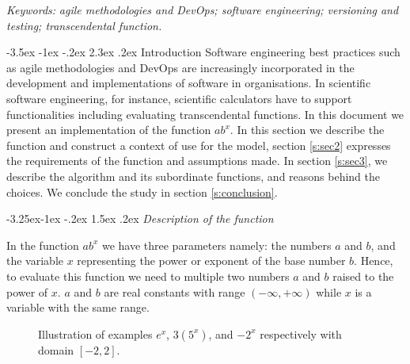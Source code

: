 \documentclass[11pt]{article}
\makeatletter
\renewcommand\section{\@startsection {section}{1}{\z@}%
                                       {-3.5ex \@plus -1ex \@minus -.2ex}%
                                       {2.3ex \@plus.2ex}%
                                       {\normalfont\fontfamily{phv}\fontsize{16}{19}\bfseries}}
\renewcommand\subsection{\@startsection{subsection}{2}{\z@}%
                                         {-3.25ex\@plus -1ex \@minus -.2ex}%
                                         {1.5ex \@plus .2ex}%
                                         {\normalfont\fontfamily{phv}\fontsize{14}{17}\bfseries}}
\makeatother
\begin{document}
	\noindent%
	{\it Keywords:} \emph{agile methodologies and DevOps; software engineering; versioning and testing; transcendental function.}


\pagebreak
\tableofcontents
\newpage


\section{Introduction} \label{s:intro}
Software engineering best practices such as agile methodologies and DevOps are increasingly incorporated in the development and implementations of software in organisations. In scientific software engineering, for instance, scientific calculators have to support functionalities including evaluating transcendental functions. In this document we present an implementation of the function $ab^x$. In this section we describe the function and construct a context of use for the model, section \ref{s:sec2} expresses the requirements of the function and assumptions made. In section \ref{s:sec3}, we describe the algorithm and its subordinate functions, and reasons behind the choices. We conclude the study in section \ref{s:conclusion}.

\subsection{\emph{Description of the function}}

In the function $ab^x$ we have three parameters namely: the numbers $a$ and $b$, and the variable $x$ representing the power or exponent of the base number $b$. Hence, to evaluate this function we need to multiple two numbers $a$ and $b$ raised to the power of $x$. $a$ and $b$ are real constants with range $(-\infty, +\infty)$ while $x$ is a variable with the same range.
\begin{figure}[H]
	\centering
	\caption{Illustration of examples $e^x$, $3(5^x)$, and $-2^x$ respectively with domain $[-2, 2]$. }
	\label{fig1}
\end{figure}
\par
\end{document}
